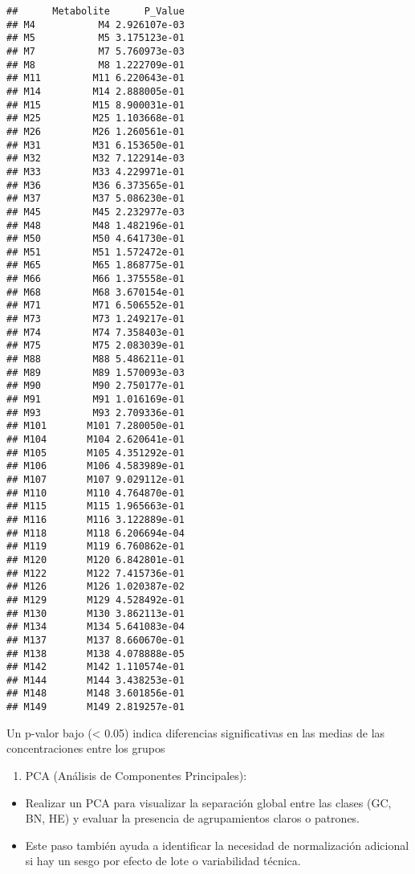 \documentclass[
]{article}
\providecommand{\tightlist}{%
  \setlength{\itemsep}{0pt}\setlength{\parskip}{0pt}}
\begin{document}
\begin{verbatim}
##      Metabolite      P_Value
## M4           M4 2.926107e-03
## M5           M5 3.175123e-01
## M7           M7 5.760973e-03
## M8           M8 1.222709e-01
## M11         M11 6.220643e-01
## M14         M14 2.888005e-01
## M15         M15 8.900031e-01
## M25         M25 1.103668e-01
## M26         M26 1.260561e-01
## M31         M31 6.153650e-01
## M32         M32 7.122914e-03
## M33         M33 4.229971e-01
## M36         M36 6.373565e-01
## M37         M37 5.086230e-01
## M45         M45 2.232977e-03
## M48         M48 1.482196e-01
## M50         M50 4.641730e-01
## M51         M51 1.572472e-01
## M65         M65 1.868775e-01
## M66         M66 1.375558e-01
## M68         M68 3.670154e-01
## M71         M71 6.506552e-01
## M73         M73 1.249217e-01
## M74         M74 7.358403e-01
## M75         M75 2.083039e-01
## M88         M88 5.486211e-01
## M89         M89 1.570093e-03
## M90         M90 2.750177e-01
## M91         M91 1.016169e-01
## M93         M93 2.709336e-01
## M101       M101 7.280050e-01
## M104       M104 2.620641e-01
## M105       M105 4.351292e-01
## M106       M106 4.583989e-01
## M107       M107 9.029112e-01
## M110       M110 4.764870e-01
## M115       M115 1.965663e-01
## M116       M116 3.122889e-01
## M118       M118 6.206694e-04
## M119       M119 6.760862e-01
## M120       M120 6.842801e-01
## M122       M122 7.415736e-01
## M126       M126 1.020387e-02
## M129       M129 4.528492e-01
## M130       M130 3.862113e-01
## M134       M134 5.641083e-04
## M137       M137 8.660670e-01
## M138       M138 4.078888e-05
## M142       M142 1.110574e-01
## M144       M144 3.438253e-01
## M148       M148 3.601856e-01
## M149       M149 2.819257e-01
\end{verbatim}

Un p-valor bajo (\textless{} 0.05) indica diferencias significativas en
las medias de las concentraciones entre los grupos

\begin{enumerate}
\def\labelenumi{\arabic{enumi}.}
\setcounter{enumi}{1}
\tightlist
\item
  PCA (Análisis de Componentes Principales):
\end{enumerate}

\begin{itemize}
\tightlist
\item
  Realizar un PCA para visualizar la separación global entre las clases
  (GC, BN, HE) y evaluar la presencia de agrupamientos claros o
  patrones.
\item
  Este paso también ayuda a identificar la necesidad de normalización
  adicional si hay un sesgo por efecto de lote o variabilidad técnica.
\end{itemize}
\end{document}
